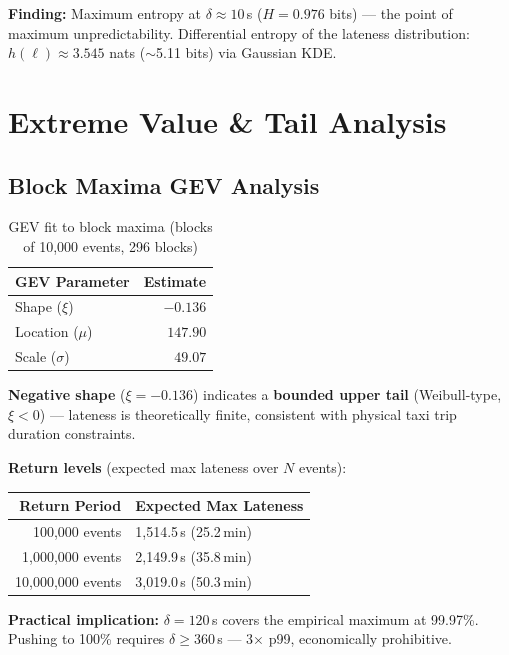 \documentclass[11pt,a4paper]{article}
\begin{document}
\textbf{Finding:} Maximum entropy at $\delta \approx 10$\,s ($H = 0.976$ bits) --- the point of maximum unpredictability.
Differential entropy of the lateness distribution: $h(\ell) \approx 3.545$ nats ($\sim$5.11 bits) via Gaussian KDE.

\section{Extreme Value \& Tail Analysis}

\subsection{Block Maxima GEV Analysis}

\begin{table}[H]
\centering
\caption{GEV fit to block maxima (blocks of 10,000 events, 296 blocks)}
\label{tab:gev}
\begin{tabular}{lr}
\toprule
\textbf{GEV Parameter} & \textbf{Estimate} \\
\midrule
Shape ($\xi$)    & $-0.136$ \\
Location ($\mu$) & $147.90$ \\
Scale ($\sigma$) & $49.07$ \\
\bottomrule
\end{tabular}
\end{table}

\textbf{Negative shape} ($\xi = -0.136$) indicates a \textbf{bounded upper tail} (Weibull-type, $\xi < 0$) --- lateness is theoretically finite, consistent with physical taxi trip duration constraints.

\textbf{Return levels} (expected max lateness over $N$ events):
\begin{center}
\begin{tabular}{rl}
\toprule
\textbf{Return Period} & \textbf{Expected Max Lateness} \\
\midrule
100,000 events    & 1,514.5\,s (25.2\,min) \\
1,000,000 events  & 2,149.9\,s (35.8\,min) \\
10,000,000 events & 3,019.0\,s (50.3\,min) \\
\bottomrule
\end{tabular}
\end{center}

\textbf{Practical implication:} $\delta = 120$\,s covers the empirical maximum at 99.97\%.
Pushing to 100\% requires $\delta \geq 360$\,s --- 3$\times$ p99, economically prohibitive.
\end{document}
